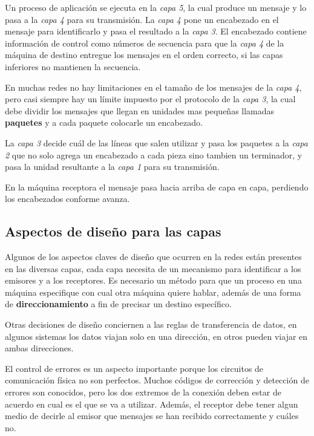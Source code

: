 \documentclass[10pt,a4paper]{report}
\begin{document}
\par Un proceso de aplicación se ejecuta en la \textit{capa 5}, la cual produce un 
mensaje y lo pasa a la \textit{capa 4} para su transmisión. La \textit{capa 4} pone un 
encabezado en el mensaje para identificarlo y pasa el resultado a la \textit{capa 3}. El 
encabezado contiene información de control como números de secuencia para que la 
\textit{capa 4} de la máquina de destino entregue los mensajes en el orden correcto, 
si las capas inferiores no mantienen la secuencia.

\par En muchas redes no hay limitaciones en el tamaño de los mensajes de la 
\textit{capa 4}, pero casi siempre hay un límite impuesto por el protocolo de la 
\textit{capa 3}, la cual debe dividir  los mensajes que llegan en unidades mas 
pequeñas llamadas \textbf{paquetes} y a cada paquete colocarle un encabezado.
\par La \textit{capa 3} decide cuál de las líneas que salen utilizar y pasa los paquetes 
a la \textit{capa 2} que no solo agrega un encabezado a cada pieza sino tambien un 
terminador, y pasa la unidad resultante a la \textit{capa 1} para su transmisión.
\par En la máquina receptora el mensaje pasa hacia arriba de capa en capa, perdiendo 
los encabezados conforme avanza.

\subsection{Aspectos de diseño para las capas}

Algunos de los aspectos claves de diseño que ocurren en la redes están presentes en 
las diversas capas, cada capa necesita de un mecanismo para identificar a los emisores 
y a los receptores. Es necesario un método para que un proceso en una máquina 
especifique con cual otra máquina quiere hablar, además de una forma de 
\textbf{direccionamiento} a fin de precisar un destino específico.

\par Otras decisiones de diseño conciernen a las reglas de transferencia de datos, en 
algunos sistemas los datos viajan solo en una dirección, en otros pueden viajar en 
ambas direcciones.

El control de errores es un aspecto importante porque los circuitos de comunicación 
física no son perfectos. Muchos códigos de corrección y detección de errores son 
conocidos, pero los dos extremos de la conexión deben estar de acuerdo en cual es el 
que se va a utilizar. Además, el receptor debe tener algun medio de decirle al emisor 
que mensajes se han recibido correctamente y cuáles no.
\end{document}
